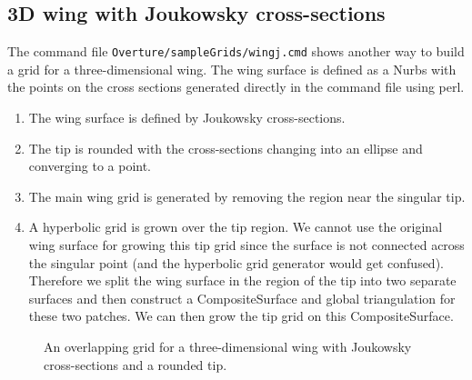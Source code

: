 \documentclass[xcolor=rgb,svgnames,dvipsnames]{article}
\newcommand{\figures}{\homeHenshaw/OvertureFigures}
\begin{document}
\subsection{3D wing with Joukowsky cross-sections}\label{sec:JoukowskyWing3d}

The command file {\tt Overture/sampleGrids/wingj.cmd} shows another way to build a grid 
for a three-dimensional wing. The wing surface is defined as a Nurbs with the points
on the cross sections generated directly in the command file using perl. 

\begin{enumerate}
  \item The wing surface is defined by Joukowsky cross-sections.
  \item The tip is rounded with the cross-sections changing into an ellipse and converging to a point. 
  \item The main wing grid is generated by removing the region near the singular tip.
  \item A hyperbolic grid is grown over the tip region. We cannot use the original wing surface for growing
        this tip grid
        since the surface is not connected across the singular point (and the hyperbolic grid generator
        would get confused). Therefore we split the wing surface in the region of the tip into two
        separate surfaces and then construct a CompositeSurface and global triangulation for these
        two patches. We can then grow the tip grid on this CompositeSurface. 
\end{enumerate}

{
\newcommand{\figWidthd}{8cm}
\newcommand{\trimfig}[2]{\trimPlot{#1}{#2}{.0}{.0}{.25}{.23}}
\begin{figure}[hbt]
\begin{center}
\end{center}
  \caption{An overlapping grid for a three-dimensional wing with Joukowsky cross-sections and
       a rounded tip. } \label{fig:JoukowskyWing3d}
\end{figure}
}
\end{document}
